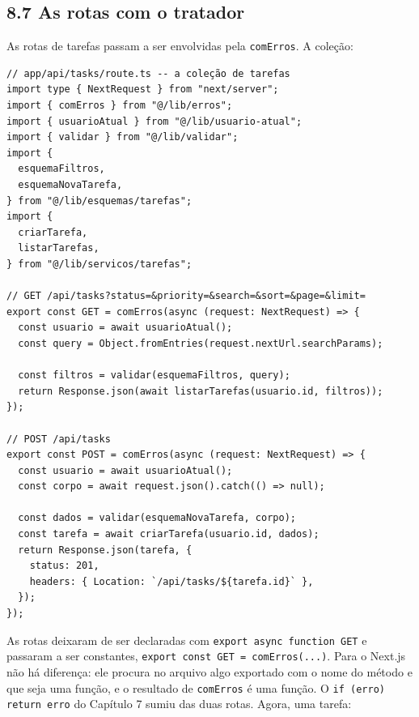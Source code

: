\subsection{8.7 As rotas com o tratador}

As rotas de tarefas passam a ser envolvidas pela \texttt{comErros}. A coleção:

\begin{codigo}
\begin{Verbatim}[breaklines=true, breaksymbolleft={}, fontsize=\footnotesize]
// app/api/tasks/route.ts -- a coleção de tarefas
import type { NextRequest } from "next/server";
import { comErros } from "@/lib/erros";
import { usuarioAtual } from "@/lib/usuario-atual";
import { validar } from "@/lib/validar";
import {
  esquemaFiltros,
  esquemaNovaTarefa,
} from "@/lib/esquemas/tarefas";
import {
  criarTarefa,
  listarTarefas,
} from "@/lib/servicos/tarefas";

// GET /api/tasks?status=&priority=&search=&sort=&page=&limit=
export const GET = comErros(async (request: NextRequest) => {
  const usuario = await usuarioAtual();
  const query = Object.fromEntries(request.nextUrl.searchParams);

  const filtros = validar(esquemaFiltros, query);
  return Response.json(await listarTarefas(usuario.id, filtros));
});

// POST /api/tasks
export const POST = comErros(async (request: NextRequest) => {
  const usuario = await usuarioAtual();
  const corpo = await request.json().catch(() => null);

  const dados = validar(esquemaNovaTarefa, corpo);
  const tarefa = await criarTarefa(usuario.id, dados);
  return Response.json(tarefa, {
    status: 201,
    headers: { Location: `/api/tasks/${tarefa.id}` },
  });
});
\end{Verbatim}
\end{codigo}

As rotas deixaram de ser declaradas com \texttt{export async function GET} e passaram a ser constantes, \texttt{export const GET = comErros(...)}. Para o Next.js não há diferença: ele procura no arquivo algo exportado com o nome do método e que seja uma função, e o resultado de \texttt{comErros} é uma função. O \texttt{if (erro) return erro} do Capítulo 7 sumiu das duas rotas. Agora, uma tarefa:

